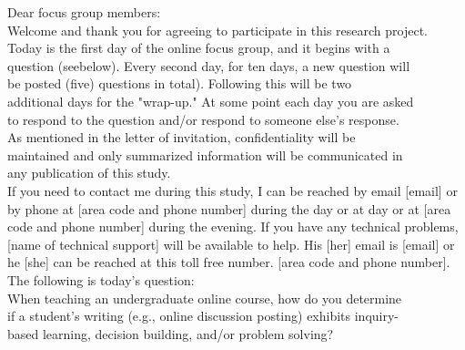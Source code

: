 \documentclass[a4]{book}
\begin{document}
\hspace*{0.7cm} Dear focus group members:\\

\vspace*{0.3cm}
\hspace*{0.7cm} Welcome and thank you for agreeing to participate in this research project.\\

\vspace*{0.3cm}
\hspace*{0.7cm} Today is the first day of the online focus group, and it begins with a \\
\hspace*{0.7cm} question (seebelow). Every second day, for ten days, a new question will \\
\hspace*{0.7cm} be posted (five) questions in total). Following this will be two  \\
\hspace*{0.7cm} additional days for the "wrap-up." At some point each day you are asked\\
\hspace*{0.7cm} to respond to the question and/or respond to someone else's response.\\
\hspace*{0.7cm} As mentioned in the letter of invitation, confidentiality will be \\
\hspace*{0.7cm} maintained and only summarized information will be communicated in\\
\hspace*{0.7cm} any publication of this study.\\

\vspace*{0.2cm}
If you need to contact me during this study, I can be reached by email [email] or by phone at [area code and phone number] during the day or at day or at [area code and phone number] during the evening. If you have any technical problems, [name of technical support] will be available to help. His [her] email is [email] or he [she] can be reached at this toll free number. [area code and phone number].\\

\vspace*{0.2cm}
The following is today's question:\\

\vspace*{0.2cm}
\hspace*{0.7cm} When teaching an undergraduate online course, how do you determine \\
\hspace*{0.7cm} if a student's writing (e.g., online discussion posting) exhibits inquiry-\\
\hspace*{0.7cm} based learning, decision building, and/or problem solving?\\
\end{document}

